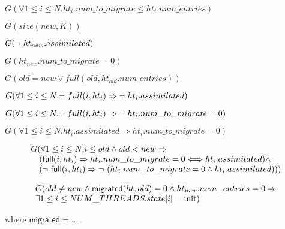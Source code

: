 \begin{lemma} %
  $G(\forall 1 \leq i \leq N. ht_i.num\_to\_migrate \leq ht_i.num\_entries)$
\end{lemma}  

\begin{lemma} %
  $G(size(new,K))$
\end{lemma}  

\begin{lemma} %
  $G(\mbox{$\neg\ ht_{new}.assimilated$})$
\end{lemma}  

\begin{lemma} %
  $G(ht_{new}.num\_to\_migrate = 0)$
\end{lemma}  

\begin{lemma} %
  $G(old = new \vee full(old, ht_{old}.num\_entries))$
\end{lemma}  

\begin{lemma} %
  $G(\forall 1 \leq i \leq N. \mbox{$\neg\ full(i,ht_{i})$} \Rightarrow \mbox{$\neg\ ht_{i}.assimilated$})$
\end{lemma}  

\begin{lemma} %
  $G(\forall 1 \leq i \leq N. \mbox{$\neg\ full(i,ht_{i})$} \Rightarrow \mbox{$\neg\ ht_{i}.num\_to\_migrate = 0$})$
\end{lemma}  

\begin{lemma} %
  $G(\forall 1 \leq i \leq N. ht_{i}.assimilated \Rightarrow ht_{i}.num\_to\_migrate = 0)$
\end{lemma}  

\begin{lemma} %
  \begin{equation*}
    \begin{array}{l}
    G(\forall 1 \leq i \leq N. i \leq old \wedge old < new \Rightarrow  \\
    \quad (\mathsf{full}(i, ht_{i}) \Rightarrow ht_{i}.num\_to\_migrate = 0 \Longleftrightarrow ht_{i}.assimilated) \wedge \\
    \quad (\mbox{$\neg\ \mathsf{full}(i, ht_{i})$} \Rightarrow \mbox{$\neg\ (ht_{i}.num\_to\_migrate = 0 \wedge ht_{i}.assimilated)$}))
    \end{array}
  \end{equation*}
\end{lemma}  

\begin{lemma} %
  \begin{equation*}
    \begin{array}{l}
      G( old \neq new \wedge \mathsf{migrated}(ht,old) = 0 \wedge ht_{new}.num\_entries = 0 \Rightarrow \\
      \exists 1 \leq i \leq NUM\_THREADS. state[i] = \mbox{init})
    \end{array}
  \end{equation*}

  where $\mathsf{migrated} = \ldots$
\end{lemma}

